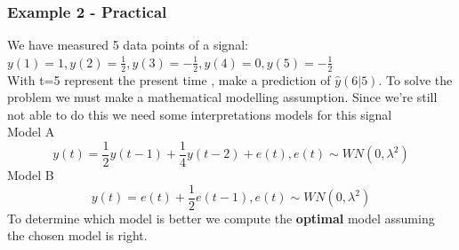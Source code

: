 \subsubsection{Example 2 - Practical}
We have measured 5 data points of a signal: \\ $ y(1)=1, y(2) =\frac{1}{2}, y(3) =-\frac{1}{2}, y(4)=0, y(5)= -\frac{1}{2}$\\
With t=5 represent the present time  , make a prediction of $ \hat{y}(6|5) $.
To solve the problem we must make a mathematical modelling assumption. Since we're still not able to do this we need some interpretations models for this signal\\
Model A $$ y(t) = \frac{1}{2}y(t-1)+\frac{1}{4}y(t-2)+e(t) , e(t) \sim WN(0,\lambda^2)$$
Model B $$ y(t) = e(t) +\frac{1}{2}e(t-1),e(t) \sim WN(0,\lambda^2)$$
To determine which model is better we compute the \textbf{optimal} model assuming the chosen model is right.
